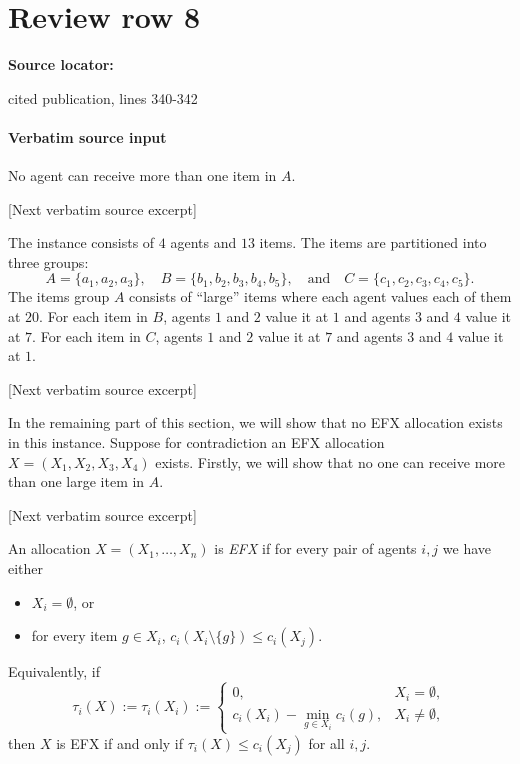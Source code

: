 \documentclass[10pt]{article}
\begin{document}
\section*{Review row 8}
\textbf{Source locator:} {\footnotesize\raggedright cited publication, lines 340-\allowbreak{}342\par}
\paragraph{Verbatim source input}
\begin{ReviewVerbatim}
\begin{proposition}
    No agent can receive more than one item in $A$.
\end{proposition}

[Next verbatim source excerpt]

The instance consists of $4$ agents and $13$ items.
The items are partitioned into three groups:
$$A=\{a_1,a_2,a_3\},\quad B=\{b_1,b_2,b_3,b_4,b_5\},\quad\mbox{and}\quad C=\{c_1,c_2,c_3,c_4,c_5\}.$$
The items group $A$ consists of ``large'' items where each agent values each of them at $20$.
For each item in $B$, agents $1$ and $2$ value it at $1$ and agents $3$ and $4$ value it at $7$.
For each item in $C$, agents $1$ and $2$ value it at $7$ and agents $3$ and $4$ value it at $1$.

[Next verbatim source excerpt]

In the remaining part of this section, we will show that no EFX allocation exists in this instance.
Suppose for contradiction an EFX allocation $X=(X_1,X_2,X_3,X_4)$ exists.
Firstly, we will show that no one can receive more than one large item in $A$.

[Next verbatim source excerpt]

\begin{definition}
An allocation $X=(X_1,\ldots,X_n)$ is \emph{EFX} if for every pair of agents $i,j$ we have either
\begin{itemize}
    \item $X_i=\emptyset$, or
    \item for every item $g\in X_i$, $c_i(X_i\setminus\{g\})\le c_i(X_j).$
\end{itemize}
Equivalently, if
\[
    \tau_i(X):=\tau_i(X_i):=
    \begin{cases}
        0, & X_i=\emptyset,\\
        c_i(X_i)-\min_{g\in X_i}c_i(g), & X_i\ne\emptyset,
    \end{cases}
\]
then $X$ is EFX if and only if $\tau_i(X)\le c_i(X_j)$ for all $i,j$.
\end{definition}
\end{ReviewVerbatim}
\end{document}
